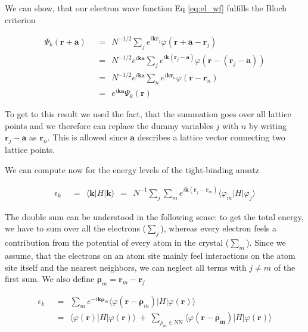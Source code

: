 \documentclass[10pt]{report}
\numberwithin{equation}{chapter}
\newcommand{\refEq}[1]{
  Eq  \ref{#1}
}
\begin{document}
We can show, that our electron wave function \refEq{eq:el_wf} fulfills the Bloch criterion


\begin{align}
  \Psi_k(\mathbf{r} + \mathbf{a}) 
  ~~& =~~ N^{-1/2} \sum_j e^{i \mathbf{k} \mathbf{r}_j} \varphi(\mathbf{r} + \mathbf{a} - \mathbf{r}_j) \nonumber \\
  ~~& =~~ N^{-1/2} e^{i\mathbf{k} \mathbf{a}} 
  \sum_j e^{i\mathbf{k} (\mathbf{r}_j - \mathbf{a})} \varphi(\mathbf{r} - (\mathbf{r}_j-\mathbf{a})) \nonumber \\
  ~~& =~~ N^{-1/2} e^{i\mathbf{k} \mathbf{a}}
  \sum_n e^{i\mathbf{k} \mathbf{r}_n} \varphi(\mathbf{r} - \mathbf{r}_n) \nonumber \\
  ~~& =~~ e^{i\mathbf{k} \mathbf{a}} \Psi_k(\mathbf{r})
\end{align}

To get to this result we used the fact, that the summation goes over all lattice points and we therefore can replace the dummy variables $j$ with $n$ by writing $\mathbf{r}_j - \mathbf{a}$ as $\mathbf{r}_n$. This is allowed since $\mathbf{a}$ describes a lattice vector connecting two lattice points.

We can compute now for the energy levels of the tight-binding ansatz

\begin{align}
  \epsilon_k ~~& =~~ \langle \mathbf{k} | H | \mathbf{k} \rangle ~~=~~
  N^{-1} \sum_j \sum_m e^{i\mathbf{k} (\mathbf{r}_j - \mathbf{r}_m)} 
  \langle \varphi_m | H | \varphi_j \rangle 
\end{align}

The double sum can be understood in the following sense: to get the total energy, we have to sum over all the electrons ($\sum_j$), whereas every electron feels a contribution from the potential of every atom in the crystal ($\sum_m$). Since we assume, that the electrons on an atom site mainly feel interactions on the atom site itself and the nearest neighbors, we can neglect all terms with $j \neq m$ of the first sum. We also define $\mathbf{\rho}_m = \mathbf{r}_m - \mathbf{r}_j$

\begin{align} \label{eq:tb_der}
  \epsilon_k ~~& =~~ \sum_m e^{-i\mathbf{k} \mathbf{\rho}_m} \langle \varphi(\mathbf{r}-\mathbf{\rho}_m) | H | \varphi(\mathbf{r}) \rangle \nonumber \\
  ~~& =~~ \langle \varphi(\mathbf{r}) |H| \varphi(\mathbf{r}) \rangle 
  ~+~ \sum_{\rho_m \in \text{NN}} \langle \varphi(\mathbf{r} - \mathbf{\rho_m}) |H| \varphi(\mathbf{r}) \rangle
\end{align}
\end{document}
